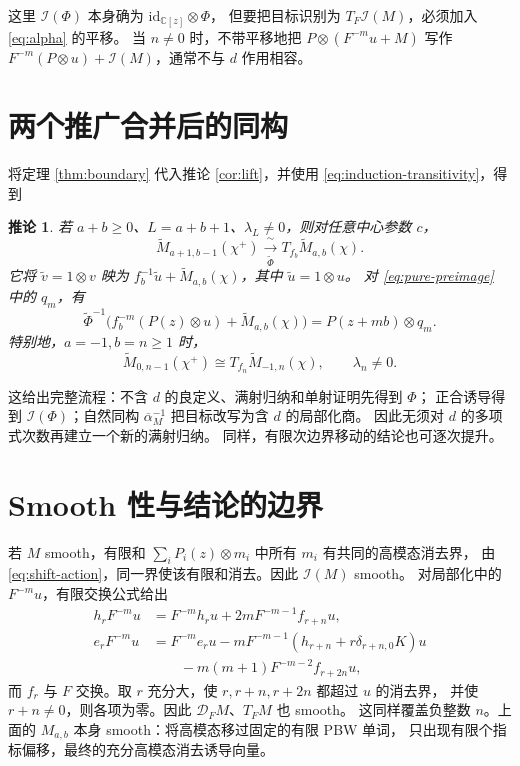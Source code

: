 \documentclass[UTF8,11pt]{ctexart}
\newcommand{\C}{\mathbb C}
\newcommand{\I}{\mathcal I}
\newcommand{\D}{\mathcal D}
\newtheorem{corollary}[theorem]{推论}
\theoremstyle{definition}
\begin{document}
这里 \(\I(\Phi)\) 本身确为 \(\mathrm{id}_{\C[z]}\otimes\Phi\)，
但要把目标识别为 \(T_F\I(M)\)，必须加入 \eqref{eq:alpha} 的平移。
当 \(n\ne0\) 时，不带平移地把 \(P\otimes(F^{-m}u+M)\) 写作
\(F^{-m}(P\otimes u)+\I(M)\)，通常不与 \(d\) 作用相容。

\section{两个推广合并后的同构}

将定理 \ref{thm:boundary} 代入推论 \ref{cor:lift}，并使用 \eqref{eq:induction-transitivity}，得到
\begin{corollary}\label{cor:final}
若 \(a+b\ge0\)、\(L=a+b+1\)、\(\lambda_L\ne0\)，则对任意中心参数 \(c\)，
\begin{equation}\label{eq:full-iso}
 \boxed{\ \widetilde M_{a+1,b-1}(\chi^+)
       \xrightarrow[\ \widetilde\Phi\ ]{\ \sim\ }
       T_{f_b}\widetilde M_{a,b}(\chi).\ }
\end{equation}
它将 \(\widetilde v=1\otimes v\) 映为
\(f_b^{-1}\widetilde u+\widetilde M_{a,b}(\chi)\)，其中 \(\widetilde u=1\otimes u\)。
对 \eqref{eq:pure-preimage} 中的 \(q_m\)，有
\begin{equation}\label{eq:full-preimage}
 \widetilde\Phi^{-1}\bigl(f_b^{-m}(P(z)\otimes u)+\widetilde M_{a,b}(\chi)\bigr)
 =P(z+mb)\otimes q_m.
\end{equation}
特别地，\(a=-1,b=n\ge1\) 时，
\[
 \widetilde M_{0,n-1}(\chi^+)\cong T_{f_n}\widetilde M_{-1,n}(\chi),
 \qquad\lambda_n\ne0.
\]
\end{corollary}

这给出完整流程：不含 \(d\) 的良定义、满射归纳和单射证明先得到 \(\Phi\)；
正合诱导得到 \(\I(\Phi)\)；自然同构 \(\overline\alpha_M^{-1}\) 把目标改写为含 \(d\) 的局部化商。
因此无须对 \(d\) 的多项式次数再建立一个新的满射归纳。
同样，有限次边界移动的结论也可逐次提升。

\section{Smooth 性与结论的边界}

若 \(M\) smooth，有限和 \(\sum_iP_i(z)\otimes m_i\) 中所有 \(m_i\) 有共同的高模态消去界，
由 \eqref{eq:shift-action}，同一界使该有限和消去。因此 \(\I(M)\) smooth。
对局部化中的 \(F^{-m}u\)，有限交换公式给出
\[
\begin{aligned}
 h_rF^{-m}u&=F^{-m}h_ru+2mF^{-m-1}f_{r+n}u,\\
 e_rF^{-m}u&=F^{-m}e_ru-mF^{-m-1}(h_{r+n}+r\delta_{r+n,0}K)u\\
 &\hspace{2em}-m(m+1)F^{-m-2}f_{r+2n}u,
\end{aligned}
\]
而 \(f_r\) 与 \(F\) 交换。取 \(r\) 充分大，使 \(r,r+n,r+2n\) 都超过 \(u\) 的消去界，
并使 \(r+n\ne0\)，则各项为零。因此 \(\D_FM\)、\(T_FM\) 也 smooth。
这同样覆盖负整数 \(n\)。上面的 \(M_{a,b}\) 本身 smooth：将高模态移过固定的有限 PBW 单词，
只出现有限个指标偏移，最终的充分高模态消去诱导向量。
\end{document}
